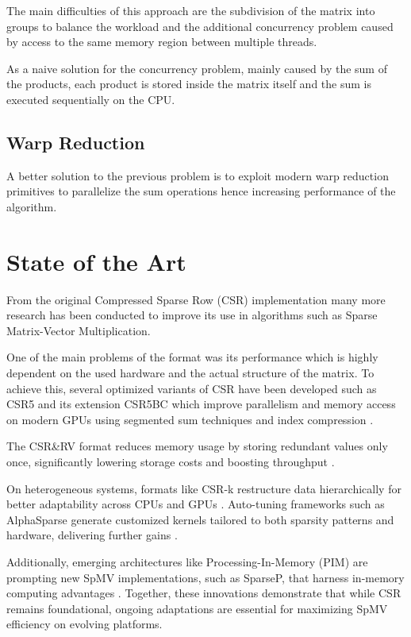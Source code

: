 \documentclass[conference]{IEEEtran}
\begin{document}
    The main difficulties of this approach are the subdivision of the matrix
    into groups to balance the workload and the additional concurrency problem
    caused by access to the same memory region between multiple threads.

    As a naive solution for the concurrency problem, mainly caused by the sum
    of the products, each product is stored inside the matrix itself and the
    sum is executed sequentially on the CPU.

    \subsection{Warp Reduction}

    A better solution to the previous problem is to exploit modern warp
    reduction primitives to parallelize the sum operations hence increasing
    performance of the algorithm.

    \section{State of the Art}

    From the original Compressed Sparse Row (CSR) \cite{eisenstat1977csr}
    implementation many more research has been conducted to improve its use in
    algorithms such as Sparse Matrix-Vector Multiplication.

    One of the main problems of the format was its performance which is highly
    dependent on the used hardware and the actual structure of the matrix.
    To achieve this, several optimized variants of CSR have been developed such
    as CSR5 and its extension CSR5BC which improve parallelism and memory
    access on modern GPUs using segmented sum techniques and index compression
    \cite{zhang2016csr5}.

    The CSR\&RV format reduces memory usage by storing redundant values only
    once, significantly lowering storage costs and boosting throughput
    \cite{tang2023csrrv}.

    On heterogeneous systems, formats like CSR-k restructure data
    hierarchically for better adaptability across CPUs and GPUs
    \cite{liu2022csrk}.
    Auto-tuning frameworks such as AlphaSparse generate customized kernels
    tailored to both sparsity patterns and hardware, delivering further gains
    \cite{yin2022alphasparse}.

    Additionally, emerging architectures like Processing-In-Memory (PIM) are
    prompting new SpMV implementations, such as SparseP, that harness in-memory
    computing advantages \cite{lee2022sparsep}.
    Together, these innovations demonstrate that while CSR remains foundational,
    ongoing adaptations are essential for maximizing SpMV efficiency on
    evolving platforms.
\end{document}
